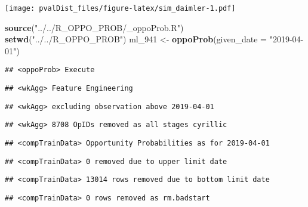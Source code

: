 \documentclass[]{article}
\newenvironment{Shaded}{\begin{snugshade}}{\end{snugshade}}
\newcommand{\CommentTok}[1]{\textcolor[rgb]{0.56,0.35,0.01}{\textit{#1}}}
\newcommand{\DataTypeTok}[1]{\textcolor[rgb]{0.13,0.29,0.53}{#1}}
\newcommand{\DecValTok}[1]{\textcolor[rgb]{0.00,0.00,0.81}{#1}}
\newcommand{\KeywordTok}[1]{\textcolor[rgb]{0.13,0.29,0.53}{\textbf{#1}}}
\newcommand{\NormalTok}[1]{#1}
\newcommand{\StringTok}[1]{\textcolor[rgb]{0.31,0.60,0.02}{#1}}
\begin{document}
\texttt{[image: pvalDist\_files/figure-latex/sim\_daimler-1.pdf]}

\begin{Shaded}
\end{Shaded}

\begin{Shaded}
\begin{Highlighting}[]
\KeywordTok{source}\NormalTok{(}\StringTok{"../../R_OPPO_PROB/_oppoProb.R"}\NormalTok{)}
\KeywordTok{setwd}\NormalTok{(}\StringTok{"../../R_OPPO_PROB"}\NormalTok{)}
\NormalTok{ml_}\DecValTok{941}\NormalTok{ <-}\StringTok{ }\KeywordTok{oppoProb}\NormalTok{(}\DataTypeTok{given_date =} \StringTok{"2019-04-01"}\NormalTok{)}
\end{Highlighting}
\end{Shaded}

\begin{verbatim}
## <oppoProb> Execute
\end{verbatim}

\begin{verbatim}
## <wkAgg> Feature Engineering
\end{verbatim}

\begin{verbatim}
## <wkAgg> excluding observation above 2019-04-01
\end{verbatim}

\begin{verbatim}
## <wkAgg> 8708 OpIDs removed as all stages cyrillic
\end{verbatim}

\begin{verbatim}
## <compTrainData> Opportunity Probabilities as for 2019-04-01
\end{verbatim}

\begin{verbatim}
## <compTrainData> 0 removed due to upper limit date
\end{verbatim}

\begin{verbatim}
## <compTrainData> 13014 rows removed due to bottom limit date
\end{verbatim}

\begin{verbatim}
## <compTrainData> 0 rows removed as rm.badstart
\end{verbatim}
\end{document}
